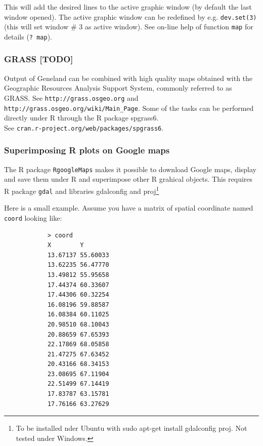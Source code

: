 \documentclass{article}
\begin{document}
 


This will add the desired lines to the active graphic window (by default the last window opened). 
The active graphic window can be redefined by e.g. \texttt{dev.set(3)} (this will set window \# 3 as active window). 
See on-line help of function \texttt{map} for details (\texttt{? map}).

\subsubsection{GRASS [TODO]}
Output of {\sc Geneland} can be combined with 
high quality maps obtained with the Geographic Resources Analysis Support System, commonly referred to as GRASS. 
See \texttt{http://grass.osgeo.org} and\\ \texttt{http://grass.osgeo.org/wiki/Main\_Page}.
Some of the tasks can be performed directly under R through the R package spgrass6.\\ 
See \texttt{cran.r-project.org/web/packages/spgrass6}.


\subsubsection[R plots and GoogleMaps]{Superimposing R plots on Google maps}

The R package {\tt RgoogleMaps} makes it possible to download Google maps, display and save them under R and superimpose 
other R grahical objects. This requires R package {\tt gdal} and libraries gdalconfig and proj\footnote{To be installed 
nder Ubuntu with sudo apt-get install gdalconfig proj. Not tested under Windows.}

Here is a small example. Assume you have a matrix of spatial coordinate named {\tt coord} looking like:\\

\begin{verbatim}
            > coord
            X        Y
            13.67137 55.60033
            13.62235 56.47770
            13.49812 55.95658
            17.44374 60.33607
            17.44306 60.32254
            16.08196 59.88587
            16.08384 60.11025
            20.98510 68.10043
            20.88659 67.65393
            22.17869 68.05858
            21.47275 67.63452
            20.43166 68.34153
            23.08695 67.11904
            22.51499 67.14419
            17.83787 63.15781
            17.76166 63.27629
\end{verbatim}
\end{document}
